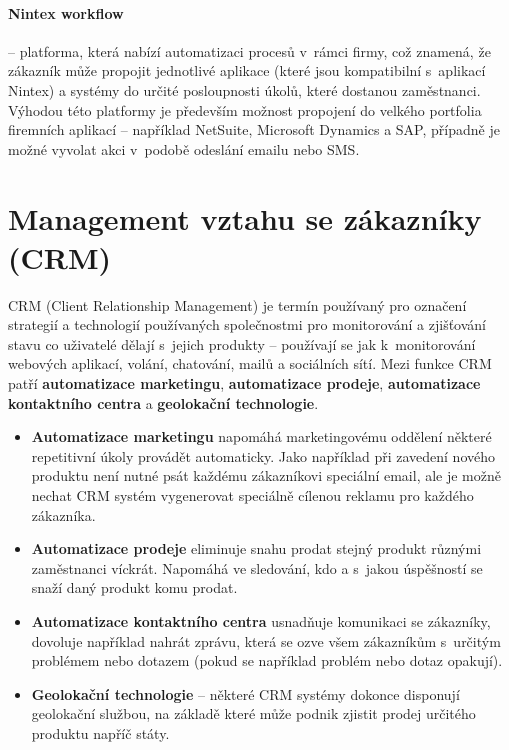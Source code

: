 \paragraph{Nintex workflow} -- platforma, která nabízí automatizaci procesů v~rámci firmy, což znamená, že zákazník může propojit jednotlivé aplikace (které jsou kompatibilní s~aplikací Nintex) a systémy do určité posloupnosti úkolů, které dostanou zaměstnanci. Výhodou této platformy je především možnost propojení do velkého portfolia firemních aplikací -- například NetSuite, Microsoft Dynamics a SAP, případně je možné vyvolat akci v~podobě odeslání emailu nebo SMS.

\section{Management vztahu se zákazníky (CRM)}
\par CRM (Client Relationship Management) je termín používaný pro označení strategií a technologií používaných společnostmi pro monitorování a zjišťování stavu co uživatelé dělají s~jejich produkty -- používají se jak k~monitorování webových aplikací, volání, chatování, mailů a sociálních sítí. Mezi funkce CRM patří \textbf{automatizace marketingu}, \textbf{automatizace prodeje}, \textbf{automatizace kontaktního centra} a \textbf{geolokační technologie}. \cite{crm}

\begin{itemize}
\item \textbf{Automatizace marketingu} napomáhá marketingovému oddělení některé repetitivní úkoly provádět automaticky. Jako například při zavedení nového produktu není nutné psát každému zákazníkovi speciální email, ale je možně nechat CRM systém vygenerovat speciálně cílenou reklamu pro každého zákazníka.
\item \textbf{Automatizace prodeje} eliminuje snahu prodat stejný produkt různými zaměstnanci víckrát. Napomáhá ve sledování, kdo a s~jakou úspěšností se snaží daný produkt komu prodat.
\item \textbf{Automatizace kontaktního centra} usnadňuje komunikaci se zákazníky, dovoluje například nahrát zprávu, která se ozve všem zákazníkům s~určitým problémem nebo dotazem (pokud se například problém nebo dotaz opakují).
\item \textbf{Geolokační technologie} -- některé CRM systémy dokonce disponují geolokační službou, na základě které může podnik zjistit prodej určitého produktu napříč státy. \cite{crm}
\end{itemize}

